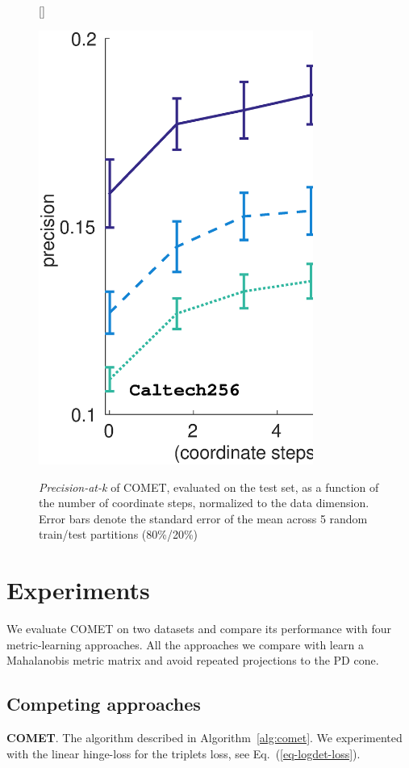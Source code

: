 \documentclass{article} %
\renewcommand{\eqref}[1]{Eq.~(\ref{#1})}
\begin{document}
\begin{figure}[h]
[\FBwidth]
{\caption{\textit{Precision-at-k} of COMET, evaluated on the test set, as a function of the number of coordinate steps, normalized to the data dimension. Error bars denote the standard error of the mean across 5 random train/test partitions (80\%/20\%)}\label{cometConvergeFig}}
{\includegraphics[width=9cm]{COMET_convergence_NIPS}}
\end{figure}

\section{Experiments}
We evaluate COMET on two datasets and compare its performance with four metric-learning approaches. All the approaches we compare with learn a Mahalanobis metric matrix and avoid repeated projections to the PD cone. 

\subsection{Competing approaches}

\textbf{COMET}. The algorithm described in Algorithm~\ref{alg:comet}. We experimented with the linear hinge-loss for the triplets loss, see \eqref{eq-logdet-loss}.
\end{document}
